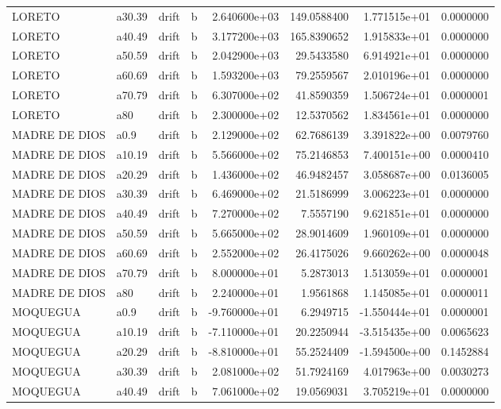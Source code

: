 \documentclass[
]{article}
\begin{document}
\begin{table}[!h]
\begin{tabular}[t]{llllrrrr}
LORETO & a30.39 & drift & b & 2.640600e+03 & 149.0588400 & 1.771515e+01 & 0.0000000\\
LORETO & a40.49 & drift & b & 3.177200e+03 & 165.8390652 & 1.915833e+01 & 0.0000000\\
LORETO & a50.59 & drift & b & 2.042900e+03 & 29.5433580 & 6.914921e+01 & 0.0000000\\
\addlinespace
LORETO & a60.69 & drift & b & 1.593200e+03 & 79.2559567 & 2.010196e+01 & 0.0000000\\
LORETO & a70.79 & drift & b & 6.307000e+02 & 41.8590359 & 1.506724e+01 & 0.0000001\\
LORETO & a80 & drift & b & 2.300000e+02 & 12.5370562 & 1.834561e+01 & 0.0000000\\
MADRE DE DIOS & a0.9 & drift & b & 2.129000e+02 & 62.7686139 & 3.391822e+00 & 0.0079760\\
MADRE DE DIOS & a10.19 & drift & b & 5.566000e+02 & 75.2146853 & 7.400151e+00 & 0.0000410\\
\addlinespace
MADRE DE DIOS & a20.29 & drift & b & 1.436000e+02 & 46.9482457 & 3.058687e+00 & 0.0136005\\
MADRE DE DIOS & a30.39 & drift & b & 6.469000e+02 & 21.5186999 & 3.006223e+01 & 0.0000000\\
MADRE DE DIOS & a40.49 & drift & b & 7.270000e+02 & 7.5557190 & 9.621851e+01 & 0.0000000\\
MADRE DE DIOS & a50.59 & drift & b & 5.665000e+02 & 28.9014609 & 1.960109e+01 & 0.0000000\\
MADRE DE DIOS & a60.69 & drift & b & 2.552000e+02 & 26.4175026 & 9.660262e+00 & 0.0000048\\
\addlinespace
MADRE DE DIOS & a70.79 & drift & b & 8.000000e+01 & 5.2873013 & 1.513059e+01 & 0.0000001\\
MADRE DE DIOS & a80 & drift & b & 2.240000e+01 & 1.9561868 & 1.145085e+01 & 0.0000011\\
MOQUEGUA & a0.9 & drift & b & -9.760000e+01 & 6.2949715 & -1.550444e+01 & 0.0000001\\
MOQUEGUA & a10.19 & drift & b & -7.110000e+01 & 20.2250944 & -3.515435e+00 & 0.0065623\\
MOQUEGUA & a20.29 & drift & b & -8.810000e+01 & 55.2524409 & -1.594500e+00 & 0.1452884\\
\addlinespace
MOQUEGUA & a30.39 & drift & b & 2.081000e+02 & 51.7924169 & 4.017963e+00 & 0.0030273\\
MOQUEGUA & a40.49 & drift & b & 7.061000e+02 & 19.0569031 & 3.705219e+01 & 0.0000000\\

\end{tabular}
\end{table}
\end{document}
